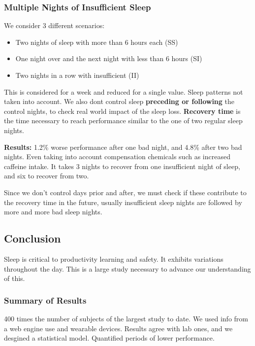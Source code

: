 \documentclass{IEEEtran}
\begin{document}
      \subsubsection{Multiple Nights of Insufficient Sleep}
        We consider 3 different scenarios:
        \begin{itemize}
          \item Two nights of sleep with more than 6 hours each (SS)
          \item One night over and the next night with less than 6 hours (SI)
          \item Two nights in a row with insufficient (II)
        \end{itemize}
        This is considered for a week and reduced for a single value. Sleep patterns not taken into account. We also dont control sleep \textbf{preceding or following} the control nights, to check real world impact of the sleep loss. \textbf{Recovery time} is the time necessary to reach performance similar to the one of two regular sleep nights. \par 
        \textbf{Results:} 1.2\% worse performance after one bad night, and 4.8\% after two bad nights. Even taking into account compensation chemicals such as increased caffeine intake. It takes 3 nights to recover from one insufficient night of sleep, and six to recover from two. \par 
        Since we don't control days prior and after, we must check if these contribute to the recovery time in the future, usually insufficient sleep nights are followed by more and more bad sleep nights. 
    \subsection{Conclusion}
      Sleep is critical to productivity learning and safety. It exhibits variations throughout the day. This is a large study necessary to advance our understanding of this. \par 
      \subsubsection{Summary of Results}
        400 times the number of subjects of the largest study to date. We used info from a web engine use and wearable devices. Results agree with lab ones, and we desgined a statistical model. Quantified periods of lower performance. \par 
\end{document}
